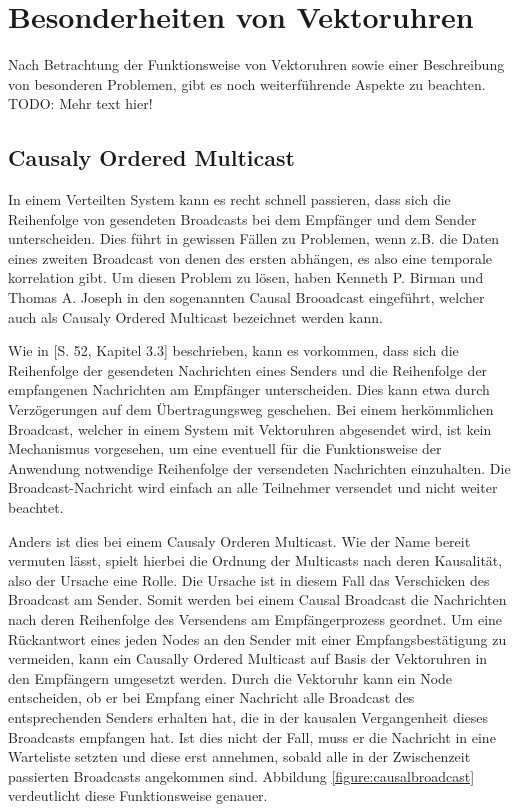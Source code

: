 \section{Besonderheiten von Vektoruhren}

Nach Betrachtung der Funktionsweise von Vektoruhren sowie einer Beschreibung von besonderen Problemen, gibt es noch weiterführende Aspekte zu beachten. 
TODO: Mehr text hier! 
\subsection{Causaly Ordered Multicast}

In einem Verteilten System kann es recht schnell passieren, dass sich die Reihenfolge von gesendeten Broadcasts bei dem Empfänger und dem Sender unterscheiden. Dies führt in gewissen Fällen zu Problemen, wenn z.B. die Daten eines zweiten Broadcast von denen des ersten abhängen, es also eine temporale korrelation gibt. Um diesen Problem zu lösen, haben Kenneth P. Birman und Thomas A. Joseph in \cite{Birman:1987:RCP:7351.7478} den sogenannten Causal Brooadcast eingeführt, welcher auch als Causaly Ordered Multicast bezeichnet werden kann.

Wie in \cite{Birman:1987:RCP:7351.7478}[S. 52, Kapitel 3.3] beschrieben, kann es vorkommen, dass sich die Reihenfolge der gesendeten Nachrichten eines Senders und die Reihenfolge der empfangenen Nachrichten am Empfänger unterscheiden. Dies kann etwa durch Verzögerungen auf dem Übertragungsweg geschehen. Bei einem herkömmlichen Broadcast, welcher in einem System mit Vektoruhren abgesendet wird, ist kein Mechanismus vorgesehen, um eine eventuell für die Funktionsweise der Anwendung notwendige Reihenfolge der versendeten Nachrichten einzuhalten. Die Broadcast-Nachricht wird einfach an alle Teilnehmer versendet und nicht weiter beachtet.

Anders ist dies bei einem Causaly Orderen Multicast. Wie der Name bereit vermuten lässt, spielt hierbei die Ordnung der Multicasts nach deren Kausalität, also der Ursache eine Rolle. Die Ursache ist in diesem Fall das Verschicken des Broadcast am Sender. Somit werden bei einem Causal Broadcast die Nachrichten nach deren Reihenfolge des Versendens am Empfängerprozess geordnet. Um eine Rückantwort eines jeden Nodes an den Sender mit einer Empfangsbestätigung zu vermeiden, kann ein Causally Ordered Multicast auf Basis der Vektoruhren in den Empfängern umgesetzt werden. Durch die Vektoruhr kann ein Node entscheiden, ob er bei Empfang einer Nachricht alle Broadcast des entsprechenden Senders erhalten hat, die in der kausalen Vergangenheit dieses Broadcasts empfangen hat. Ist dies nicht der Fall, muss er die Nachricht in eine Warteliste setzten und diese erst annehmen, sobald alle in der Zwischenzeit passierten Broadcasts angekommen sind. Abbildung \ref{figure:causalbroadcast} verdeutlicht diese Funktionsweise genauer.

